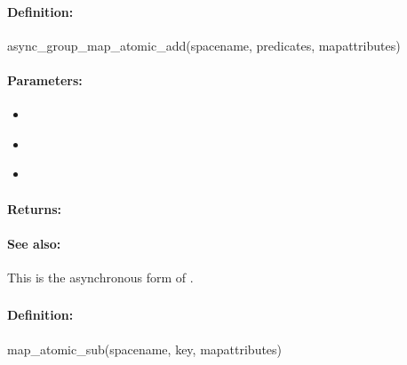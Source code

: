 \paragraph{Definition:}
\begin{rubycode}
async_group_map_atomic_add(spacename, predicates, mapattributes)
\end{rubycode}

\paragraph{Parameters:}
\begin{itemize}[noitemsep]
\item {}\\

\item {}\\

\item {}\\

\end{itemize}

\paragraph{Returns:}


\paragraph{See also:}  This is the asynchronous form of .

\pagebreak
\subsubsection{}
\label{api:ruby:map_atomic_sub}


\paragraph{Definition:}
\begin{rubycode}
map_atomic_sub(spacename, key, mapattributes)
\end{rubycode}

